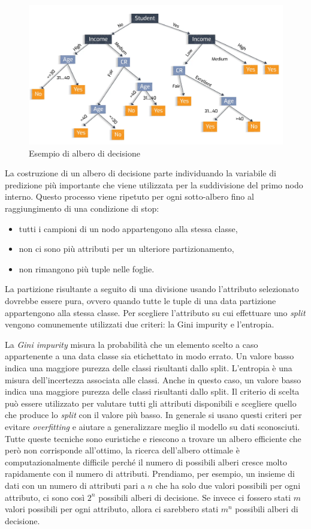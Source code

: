 \documentclass[12pt,italian]{report}
\begin{document}
	\begin{figure}[h]
		\centering
		\includegraphics[width=0.7\linewidth]{immagini/decisionTree.png}
		\caption{Esempio di albero di decisione}
		\label{fig:DecisionTree}
	\end{figure}
	La costruzione di un albero di decisione parte individuando la variabile di predizione più importante che viene utilizzata per la suddivisione del primo nodo interno. Questo processo viene ripetuto per ogni sotto-albero fino al raggiungimento di una condizione di stop:
	\begin{itemize}
		\item tutti i campioni di un nodo appartengono alla stessa classe,
		\item non ci sono più attributi per un ulteriore partizionamento,
		\item non rimangono più tuple nelle foglie.
	\end{itemize}
	La partizione risultante a seguito di una divisione usando l'attributo selezionato dovrebbe essere pura, ovvero quando tutte le tuple di una data partizione appartengono alla stessa classe. 
	Per scegliere l'attributo su cui effettuare uno \textit{split} vengono comunemente utilizzati due criteri: la Gini impurity e l'entropia.
	
	La \textit{Gini impurity} misura la probabilità che un elemento scelto a caso appartenente a una data classe sia etichettato in modo errato. Un valore basso indica una maggiore purezza delle classi risultanti dallo split.
	L'entropia è una misura dell'incertezza associata alle classi. Anche in questo caso, un valore basso indica una maggiore purezza delle classi risultanti dallo split.
	Il criterio di scelta può essere utilizzato per valutare tutti gli attributi disponibili e scegliere quello che produce lo \textit{split} con il valore più basso.
	In generale si usano questi criteri per evitare \textit{overfitting} e aiutare a generalizzare meglio il modello su dati sconosciuti.
	Tutte queste tecniche sono euristiche e riescono a trovare un albero efficiente che però non corrisponde all'ottimo, la ricerca dell'albero ottimale è computazionalmente difficile perché il numero di possibili alberi cresce molto rapidamente con il numero di attributi. Prendiamo, per esempio, un insieme di dati con un numero di attributi pari a $n$ che ha solo due valori possibili per ogni attributo, ci sono così $2^n$ possibili alberi di decisione. Se invece ci fossero stati $m$ valori possibili per ogni attributo, allora ci sarebbero stati $m^n$ possibili alberi di decisione.
	
\end{document}
